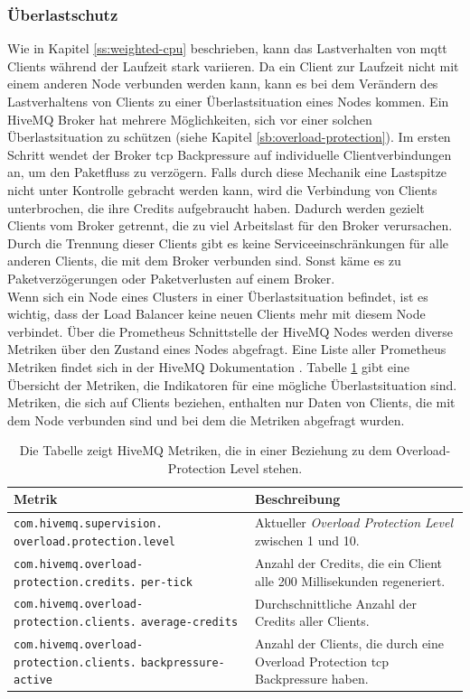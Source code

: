 \subsubsection{Überlastschutz} \label{ss:circuit-breaking}
Wie in Kapitel \ref{ss:weighted-cpu} beschrieben, kann das Lastverhalten von \ac{mqtt} Clients während der Laufzeit stark variieren. Da ein Client zur Laufzeit nicht mit einem anderen Node verbunden werden kann, kann es bei dem Verändern des Lastverhaltens von Clients zu einer Überlastsituation eines Nodes kommen.
Ein HiveMQ Broker hat mehrere Möglichkeiten, sich vor einer solchen Überlastsituation zu schützen (siehe Kapitel \ref{sb:overload-protection}).
Im ersten Schritt wendet der Broker \ac{tcp} Backpressure auf individuelle Clientverbindungen an, um den Paketfluss zu verzögern.
Falls durch diese Mechanik eine Lastspitze nicht unter Kontrolle gebracht werden kann, wird die Verbindung von Clients unterbrochen, die ihre Credits aufgebraucht haben.
Dadurch werden gezielt Clients vom Broker getrennt, die zu viel Arbeitslast für den Broker verursachen.
Durch die Trennung dieser Clients gibt es keine Serviceeinschränkungen für alle anderen Clients, die mit dem Broker verbunden sind.
Sonst käme es zu Paketverzögerungen oder Paketverlusten auf einem Broker.
\\
Wenn sich ein Node eines Clusters in einer Überlastsituation befindet, ist es wichtig, dass der Load Balancer keine neuen Clients mehr mit diesem Node verbindet.
Über die Prometheus Schnittstelle der HiveMQ Nodes werden diverse Metriken über den Zustand eines Nodes abgefragt.
Eine Liste aller Prometheus Metriken findet sich in der HiveMQ Dokumentation \cite{MonitoringHiveMQDocumentation}.
Tabelle \ref{table:overload-protection-metrics} gibt eine Übersicht der Metriken, die Indikatoren für eine mögliche Überlastsituation sind. Metriken, die sich auf Clients beziehen, enthalten nur Daten von Clients, die mit dem Node verbunden sind und bei dem die Metriken abgefragt wurden.
\begin{table}[htbp]
\centering
\renewcommand{\arraystretch}{1.5}
\begin{tabularx}{\textwidth}{|p{5cm}|X|}
    \hline
    \textbf{Metrik} & \textbf{Beschreibung} \\
    \hline
    \hline
    \verb|com.hivemq.supervision.| \verb|overload.protection.level| & Aktueller \textit{Overload Protection Level} zwischen 1 und 10. \\
    \hline
    \verb|com.hivemq.overload-| \verb|protection.credits.| \verb|per-tick| & Anzahl der Credits, die ein Client alle 200 Millisekunden regeneriert. \\
    \hline
    \verb|com.hivemq.overload-| \verb|protection.clients.| \verb|average-credits| & Durchschnittliche Anzahl der Credits aller Clients. \\
    \hline
    \verb|com.hivemq.overload-| \verb|protection.clients.| \verb|backpressure-active| & Anzahl der Clients, die durch eine Overload Protection \ac{tcp} Backpressure haben. \\
    \hline
\end{tabularx}
\caption{Die Tabelle zeigt HiveMQ Metriken, die in einer Beziehung zu dem Overload-Protection Level stehen.}
\label{table:overload-protection-metrics}
\end{table}

